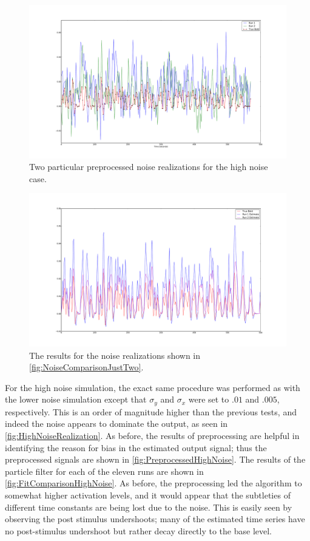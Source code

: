 \begin{figure}
\includegraphics[clip=true,trim=6cm 2cm 6cm 3.5cm,width=17cm]{images/highnoise_56_noise}
\caption{Two particular preprocessed noise realizations for the high noise case.}
\label{fig:NoiseComparisonJustTwo}
\end{figure}

\begin{figure}
\includegraphics[clip=true,trim=6cm 2cm 6cm 3.5cm,width=17cm]{images/comparison_highnoise_just2}
\caption{The results for the noise realizations shown in \autoref{fig:NoiseComparisonJustTwo}.}
\label{fig:FitComparisonHighNoiseJust2}
\end{figure}

For the high noise simulation, the exact same procedure was performed as with the lower
noise simulation except that $\sigma_y$ and $\sigma_x$ were set to $.01$ and $.005$,
respectively. This is an order of magnitude higher than the previous tests, and indeed the
noise appears to dominate the output, as seen in \autoref{fig:HighNoiseRealization}.  
As before, the results of preprocessing are helpful in identifying the reason for
bias in the estimated output signal; thus the preprocessed signals are shown in 
\autoref{fig:PreprocessedHighNoise}. The results of the particle filter
for each of the eleven runs are shown in \autoref{fig:FitComparisonHighNoise}. 
As before, the preprocessing led the algorithm
to somewhat higher activation levels, and it would appear that the subtleties of
different time constants are being lost due to the noise. This is easily seen
by observing the post stimulus undershoots; many of the estimated time series
have no post-stimulus undershoot but rather decay directly to the base level.


